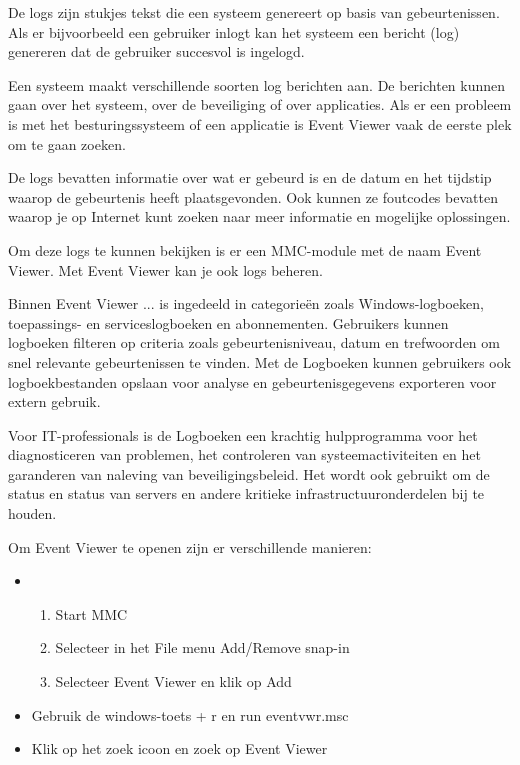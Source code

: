 De logs zijn stukjes tekst die een systeem genereert op basis van gebeurtenissen. Als er bijvoorbeeld een gebruiker inlogt kan het systeem een bericht (log) genereren dat de gebruiker succesvol is ingelogd.

Een systeem maakt verschillende soorten log berichten aan. De berichten kunnen gaan over het systeem, over de beveiliging of over applicaties. Als er een probleem is met het besturingssysteem of een applicatie is Event Viewer vaak de eerste plek om te gaan zoeken.

De logs bevatten informatie over wat er gebeurd is en de datum en het tijdstip waarop de gebeurtenis heeft plaatsgevonden. Ook kunnen ze foutcodes bevatten waarop je op Internet kunt zoeken naar meer informatie en mogelijke oplossingen.

Om deze logs te kunnen bekijken is er een MMC-module met de naam Event Viewer. Met Event Viewer kan je ook logs beheren.

Binnen Event Viewer ...
is ingedeeld in categorieën zoals Windows-logboeken, toepassings- en serviceslogboeken en abonnementen. Gebruikers kunnen logboeken filteren op criteria zoals gebeurtenisniveau, datum en trefwoorden om snel relevante gebeurtenissen te vinden. Met de Logboeken kunnen gebruikers ook logboekbestanden opslaan voor analyse en gebeurtenisgegevens exporteren voor extern gebruik.

Voor IT-professionals is de Logboeken een krachtig hulpprogramma voor het diagnosticeren van problemen, het controleren van systeemactiviteiten en het garanderen van naleving van beveiligingsbeleid. Het wordt ook gebruikt om de status en status van servers en andere kritieke infrastructuuronderdelen bij te houden.

Om Event Viewer te openen zijn er verschillende manieren:
\begin{itemize}
\item
	\begin{enumerate}
		\item Start MMC
		\item Selecteer in het File menu Add/Remove snap-in
		\item Selecteer Event Viewer en klik op Add
	\end{enumerate}
\item Gebruik de windows-toets + r en run eventvwr.msc
\item Klik op het zoek icoon en zoek op Event Viewer
\end{itemize}


